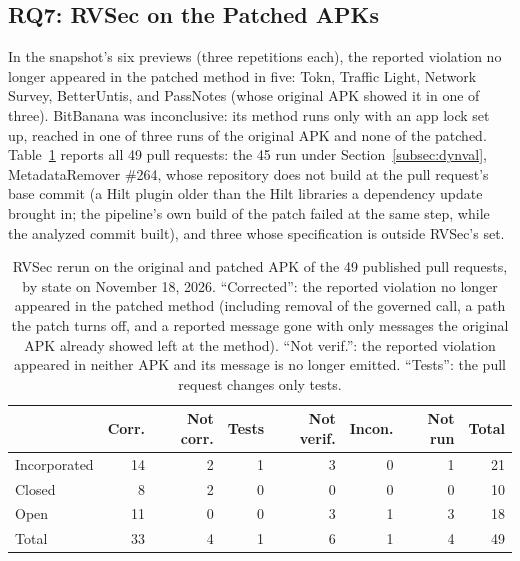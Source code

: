 \documentclass[conference]{IEEEtran}
\newcommand{\researchq}[1]{\textbf{RQ#1}}
\begin{document}
\subsection{\researchq{7}: RVSec on the Patched APKs}
\label{subsec:rq7}

In the snapshot's six previews (three repetitions each), the reported violation
no longer appeared in the patched method in five: Tokn, Traffic Light, Network
Survey, BetterUntis, and PassNotes (whose original APK showed it in one of
three). BitBanana was inconclusive: its method runs only with an app lock set
up, reached in one of three runs of the original APK and none of the patched.
Table~\ref{tab:dynval} reports all 49 pull requests: the 45 run under
Section~\ref{subsec:dynval}, MetadataRemover \#264, whose repository does not
build at the pull request's base commit (a Hilt plugin older than the Hilt
libraries a dependency update brought in; the pipeline's own build of the
patch failed at the same step, while the analyzed commit built), and three whose specification is outside RVSec's
set.

\begin{table}[H]
\centering
\caption{RVSec rerun on the original and patched APK of the 49 published pull
requests, by state on November 18, 2026. ``Corrected'': the reported violation
no longer appeared in the patched method (including removal of the governed
call, a path the patch turns off, and a reported message gone with only
messages the original APK already showed left at the method). ``Not verif.'':
the reported violation appeared in neither APK and its message is no longer
emitted. ``Tests'': the pull request changes only tests.}
\label{tab:dynval}
\footnotesize
\setlength{\tabcolsep}{3pt}
\begin{tabular}{lrrrrrrr}
\toprule
 & Corr. & Not corr. & Tests & Not verif. & Incon. & Not run & Total \\
\midrule
Incorporated & 14 & 2 & 1 & 3 & 0 & 1 & 21 \\
Closed       & 8 & 2 & 0 & 0 & 0 & 0 & 10 \\
Open         & 11 & 0 & 0 & 3 & 1 & 3 & 18 \\
\midrule
Total        & 33 & 4 & 1 & 6 & 1 & 4 & 49 \\
\bottomrule
\end{tabular}
\end{table}
\end{document}
